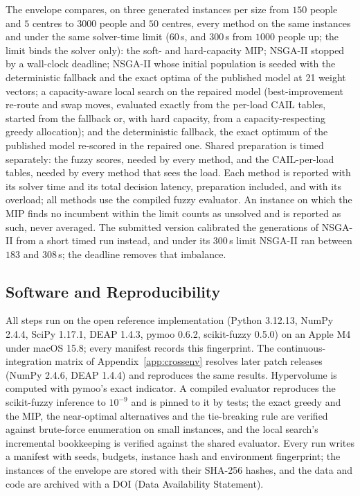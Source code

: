 \documentclass[systems,article,accept,moreauthors,pdftex]{Definitions/mdpi}
\begin{document}
The envelope compares, on three generated instances per size from $150$ people and $5$ centres
to $3000$ people and $50$ centres, every method on the same instances and under the same
solver-time limit ($60$\,s, and $300$\,s from $1000$ people up; the limit binds the solver only): the soft- and hard-capacity MIP;
NSGA-II stopped by a wall-clock deadline; NSGA-II whose initial population is seeded with the
deterministic fallback and the exact optima of the published model at 21 weight vectors; a
capacity-aware local search on the repaired model (best-improvement re-route and swap moves,
evaluated exactly from the per-load CAIL tables, started from the fallback or, with hard
capacity, from a capacity-respecting greedy allocation); and the deterministic fallback, the
exact optimum of the published model re-scored in the repaired one. Shared preparation is timed
separately: the fuzzy scores, needed by every method, and the CAIL-per-load tables, needed by
every method that sees the load. Each method is reported with its solver time and its total
decision latency, preparation included, and with its overload; all methods use the compiled
fuzzy evaluator. An instance on which the MIP finds no incumbent within the limit counts as
unsolved and is reported as such, never averaged. The submitted version calibrated the
generations of NSGA-II from a short timed run instead, and under its $300$\,s limit NSGA-II ran
between $183$ and $308$\,s; the deadline removes that imbalance.

\subsection{Software and Reproducibility}
All steps run on the open reference implementation (Python 3.12.13, NumPy 2.4.4, SciPy
1.17.1, DEAP 1.4.3, pymoo 0.6.2, scikit-fuzzy 0.5.0) on an Apple M4 under macOS 15.8; every
manifest records this fingerprint. The continuous-integration matrix of
Appendix~\ref{app:crossenv} resolves later patch releases (NumPy 2.4.6, DEAP 1.4.4) and
reproduces the same results. Hypervolume is computed with pymoo's exact indicator. A
compiled evaluator reproduces the
scikit-fuzzy inference to $10^{-9}$ and is pinned to it by tests; the exact greedy and the
MIP, the near-optimal alternatives and the tie-breaking rule are verified against brute-force
enumeration on small instances, and the local search's incremental bookkeeping is verified against the
shared evaluator. Every run writes a manifest with seeds,
budgets, instance hash and environment fingerprint; the instances of the envelope are stored
with their SHA-256 hashes, and the data and code are archived with a DOI (Data Availability
Statement).
\end{document}
